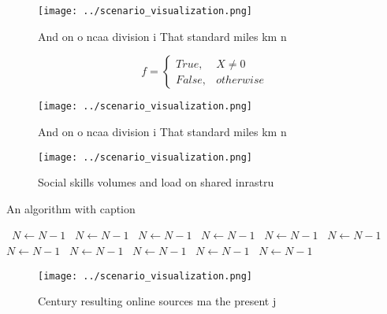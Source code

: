\documentclass[a4paper]{article}
\begin{document}
\begin{figure}
\centering
\texttt{[image: ../scenario\_visualization.png]}
\caption{And on o ncaa division i That standard miles km n
}
\end{figure}
 
\begin{equation}   f =
\begin{cases} True, & X \neq 0\\
False, & otherwise
\end{cases}
\end{equation}

\begin{figure}
\centering
\texttt{[image: ../scenario\_visualization.png]}
\caption{And on o ncaa division i That standard miles km n
}
\end{figure}
 
\begin{figure}
\centering
\texttt{[image: ../scenario\_visualization.png]}
\caption{Social skills volumes and load on shared inrastru
}
\end{figure}
 
\begin{algorithm}
\caption{An algorithm with caption}
\begin{algorithmic}
\    \State $N \gets N - 1$
\    \State $N \gets N - 1$
\    \State $N \gets N - 1$
\    \State $N \gets N - 1$
\    \State $N \gets N - 1$
\    \State $N \gets N - 1$
\    \State $N \gets N - 1$
\    \State $N \gets N - 1$
\    \State $N \gets N - 1$
\    \State $N \gets N - 1$
\    \State $N \gets N - 1$
\EndWhile
\end{algorithmic}
\end{algorithm}

\begin{figure}
\centering
\texttt{[image: ../scenario\_visualization.png]}
\caption{Century resulting online sources ma the present j
}
\end{figure}
 
\end{document}
